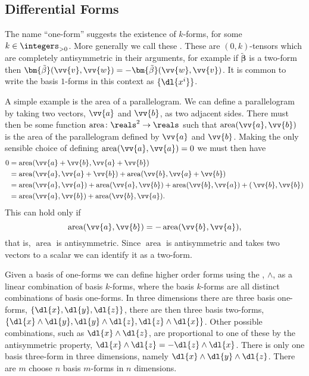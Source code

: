 \documentclass[fleqn]{NotesClass}
\newcommand*{\cv}[1]{\bm{\tilde{#1}}}
\begin{document}
    \subsection{Differential Forms}
    The name \enquote{one-form} suggests the existence of \(k\)-forms, for some \(k \in \integers_{>0}\).
    More generally we call these .
    These are \((0, k)\)-tensors which are completely antisymmetric in their arguments, for example if \(\cv{\beta}\) is a two-form then \(\cv{\beta}(\vv{v}, \vv{w}) = -\cv{\beta}(\vv{w}, \vv{v})\).
    It is common to write the basis \(1\)-forms in this context as \(\{\dl{x^i}\}\).
    
    A simple example is the area of a parallelogram.
    We can define a parallelogram by taking two vectors, \(\vv{a}\) and \(\vv{b}\), as two adjacent sides.
    There must then be some function \(\mathop{\mathrm{area}} \colon \reals^2 \to \reals\) such that \(\mathop{\mathrm{area}}(\vv{a}, \vv{b})\) is the area of the parallelogram defined by \(\vv{a}\) and \(\vv{b}\).
    Making the only sensible choice of defining \(\mathop{\mathrm{area}}(\vv{a}, \vv{a}) = 0\) we must then have
    \begin{align}
        0 &= \mathop{\mathrm{area}}(\vv{a} + \vv{b}, \vv{a} + \vv{b})\\
        &= \mathop{\mathrm{area}}(\vv{a}, \vv{a} + \vv{b}) + \mathop{\mathrm{area}}(\vv{b}, \vv{a} + \vv{b})\\
        &= \mathop{\mathrm{area}}(\vv{a}, \vv{a}) + \mathop{\mathrm{area}}(\vv{a}, \vv{b}) + \mathop{\mathrm{area}}(\vv{b}, \vv{a}) + \mathop(\vv{b}, \vv{b})\\
        &= \mathop{\mathrm{area}}(\vv{a}, \vv{b}) + \mathop{\mathrm{area}}(\vv{b}, \vv{a}).
    \end{align}
    This can hold only if
    \begin{equation}
        \mathop{\mathrm{area}}(\vv{a}, \vv{b}) = -\mathop{\mathrm{area}}(\vv{b}, \vv{a}),
    \end{equation}
    that is, \(\mathop{\mathrm{area}}\) is antisymmetric.
    Since \(\mathop{\mathrm{area}}\) is antisymmetric and takes two vectors to a scalar we can identify it as a two-form.
    
    Given a basis of one-forms we can define higher order forms using the , \(\wedge\), as a linear combination of basis \(k\)-forms, where the basis \(k\)-forms are all distinct combinations of basis one-forms.
    In three dimensions there are three basis one-forms, \(\{\dl{x}, \dl{y}, \dl{z}\}\), there are then three basis two-forms, \(\{\dl{x} \wedge \dl{y}, \dl{y} \wedge \dl{z}, \dl{z} \wedge \dl{x}\}\).
    Other possible combinations, such as \(\dl{x} \wedge \dl{z}\), are proportional to one of these by the antisymmetric property, \(\dl{x} \wedge \dl{z} = - \dl{z} \wedge \dl{x}\).
    There is only one basis three-form in three dimensions, namely \(\dl{x} \wedge \dl{y} \wedge \dl{z}\).
    There are \(m\) choose \(n\) basis \(m\)-forms in \(n\) dimensions.
    
\end{document}
